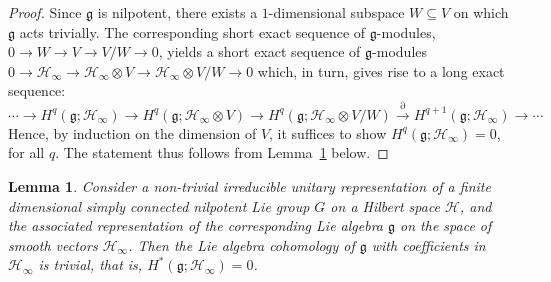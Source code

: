 \documentclass[reqno,12pt]{amsart}
\newcommand\goe{\mathfrak g}
\theoremstyle{plain}
\newtheorem{lemma}[theorem]{Lemma}
\theoremstyle{definition}
\begin{document}
\begin{proof}
Since $\goe$ is nilpotent, there exists a $1$-dimensional subspace $W\subseteq V$ on which $\goe$ acts trivially.
The corresponding short exact sequence of $\goe$-modules, $0\to W\to V\to V/W\to0$, yields a short exact sequence of $\goe$-modules $0\to\mathcal H_\infty\to\mathcal H_\infty\otimes  V\to\mathcal H_\infty\otimes  V/W\to0$ which, in turn, gives rise to a long exact sequence:
$$
\cdots\to H^q(\goe;\mathcal H_\infty)\to H^q(\goe;\mathcal H_\infty\otimes V)\to H^q(\goe;\mathcal H_\infty\otimes V/W)\xrightarrow\partial H^{q+1}(\goe;\mathcal H_\infty)\to\cdots
$$
Hence, by induction on the dimension of $V$, it suffices to show $H^q(\goe;\mathcal H_\infty)=0$, for all $q$.
The statement thus follows from Lemma~\ref{L:Hnoe} below.
\end{proof}


\begin{lemma}\label{L:Hnoe}
Consider a non-trivial irreducible unitary representation of a finite dimensional simply connected nilpotent Lie group $G$ on a Hilbert space $\mathcal H$, and the associated representation of the corresponding Lie algebra $\goe$ on the space of smooth vectors $\mathcal H_\infty$.
Then the Lie algebra cohomology of $\goe$ with coefficients in $\mathcal H_\infty$ is trivial, that is, $H^*(\goe;\mathcal H_\infty)=0$.
\end{lemma}
\end{document}
